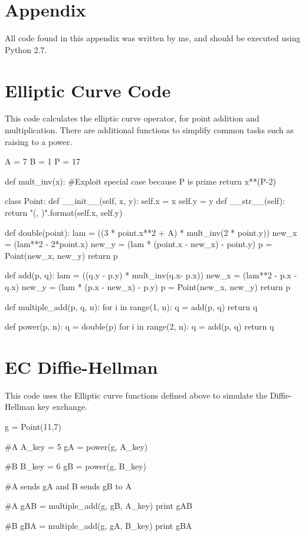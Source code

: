 \documentclass[11pt,a4paper,twoside]{article}
\begin{document}
\vfill
\pagebreak
\section*{Appendix} 
\appendix 

All code found in this appendix was written by me, and should be executed using
Python 2.7. 

\section{Elliptic Curve Code}
\label{ECC}
This code calculates the elliptic curve operator, for point addition and
multiplication. There are additional functions to simplify common tasks such as
raising to a power. 
\begin{python}
A = 7
B = 1
P = 17

def mult_inv(x):
    #Exploit special case because P is prime
    return x**(P-2) %

class Point:
    def __init__(self, x, y):
        self.x = x
        self.y = y
    def __str__(self):
        return "({}, {})".format(self.x, self.y)
    
def double(point):
    lam = ((3 * point.x**2 + A) * mult_inv(2 * point.y)) %
    new_x = (lam**2 - 2*point.x) %
    new_y = (lam * (point.x - new_x) - point.y) %
    p = Point(new_x, new_y)
    return p

def add(p, q):
    lam = ((q.y - p.y) * mult_inv(q.x- p.x)) %
    new_x = (lam**2 - p.x - q.x) %
    new_y = (lam * (p.x - new_x) - p.y) %
    p = Point(new_x, new_y)
    return p

def multiple_add(p, q, n):
    for i in range(1, n):
        q = add(p, q)
    return q

def power(p, n):
    q = double(p)
    for i in range(2, n):
        q = add(p, q)
    return q
\end{python}
\vfill
\pagebreak

\section{EC Diffie-Hellman}
\label{ECDH}
This code uses the Elliptic curve functions defined above to simulate the
Diffie-Hellman key exchange. 
\begin{python}
g = Point(11,7)

#A 
A_key = 5
gA = power(g, A_key)

#B 
B_key = 6
gB = power(g, B_key)

#A sends gA and B sends gB to A

#A 
gAB = multiple_add(g, gB, A_key)
print gAB

#B 
gBA = multiple_add(g, gA, B_key)
print gBA
\end{python}
\end{document}

